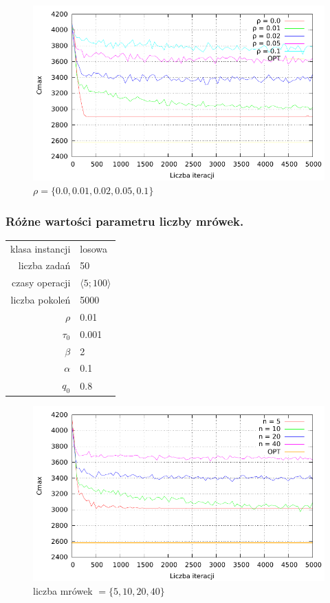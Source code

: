\documentclass[10pt,a4paper]{article}
\begin{document}
\begin{figure}[h]
    \centering
    \includegraphics{./figures/inst_01_rnd_evapor_smooth.pdf}
    \caption{$ \rho = \{ 0.0, 0.01, 0.02, 0.05, 0.1 \} $}
\end{figure}


\newpage
\subsubsection{Różne wartości parametru liczby mrówek.}
\vspace{6 mm}
\begin{center}
\begin{tabular}{|r|l|}
  \hline
  klasa instancji & losowa \\
  liczba zadań & 50 \\
  czasy operacji & $ \langle 5;100 \rangle $  \\
  liczba pokoleń & 5000 \\
  $ \rho $ & 0.01 \\
  $ \tau_0 $ & 0.001 \\
  $ \beta $ & 2 \\
  $ \alpha $ & 0.1 \\
  $ q_0 $ & 0.8 \\
  \hline
\end{tabular}
\end{center}

\begin{figure}[h]
    \centering
    \includegraphics{./figures/inst_01_rnd_antno_smooth.pdf}
    \caption{liczba mrówek $= \{ 5, 10, 20, 40 \} $}
\end{figure}
\end{document}
